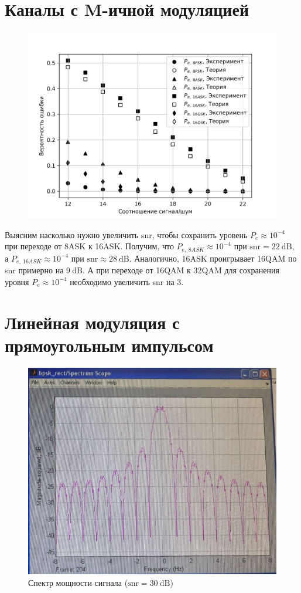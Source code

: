 \documentclass[14pt, a4paper]{article}
\begin{document}
\section{Каналы с M-ичной модуляцией}

\begin{figure}[H]
\centering
\includegraphics[width=.7\linewidth]{../images/rt2-5}
\end{figure}

Выясним насколько нужно увеличить snr, чтобы сохранить уровень $P_e\approx10^{-4}$ при переходе от 8ASK к 16ASK. Получим, что $P_{e,\ 8ASK}\approx10^{-4}$ при  $\text{snr}=22\ \text{dB}$, а $P_{e,\ 16ASK}\approx10^{-4}$ при  $\text{snr}\approx28\ \text{dB}$. Аналогично, 16ASK проигрывает 16QAM по snr примерно на $9\ \text{dB}$. А при переходе от 16QAM к 32QAM для сохранения уровня $P_e\approx10^{-4}$ необходимо увеличить snr на 3.

\section{Линейная модуляция с прямоугольным импульсом}

\begin{figure}[H]
\centering
\includegraphics[width=.7\linewidth]{../images/rt2-6}
\caption{Спектр мощности сигнала ($\text{snr}=30\ \text{dB}$)}
\end{figure}
\end{document}
